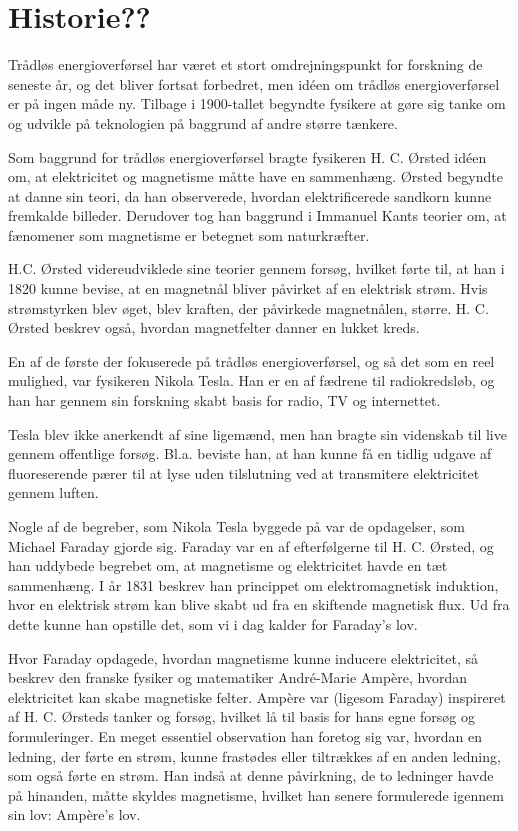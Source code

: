 \section{Historie??}

Trådløs energioverførsel har været et stort omdrejningspunkt for forskning de seneste år, og det bliver fortsat forbedret, men idéen om trådløs energioverførsel er på ingen måde ny. Tilbage i 1900-tallet begyndte fysikere at gøre sig tanke om og udvikle på teknologien på baggrund af andre større tænkere.

Som baggrund for trådløs energioverførsel bragte fysikeren H. C. Ørsted idéen om, at elektricitet og magnetisme måtte have en sammenhæng. Ørsted begyndte at danne sin teori, da han observerede, hvordan elektrificerede sandkorn kunne fremkalde billeder. Derudover tog han baggrund i Immanuel Kants teorier om, at fænomener som magnetisme er betegnet som naturkræfter.

H.C. Ørsted videreudviklede sine teorier gennem forsøg, hvilket førte til, at han i 1820 kunne bevise, at en magnetnål bliver påvirket af en elektrisk strøm. Hvis strømstyrken blev øget, blev kraften, der påvirkede magnetnålen, større. H. C. Ørsted beskrev også, hvordan magnetfelter danner en lukket kreds.

En af de første der fokuserede på trådløs energioverførsel, og så det som en reel mulighed, var fysikeren Nikola Tesla. Han er en af fædrene til radiokredsløb, og han har gennem sin forskning skabt basis for radio, TV og internettet.

Tesla blev ikke anerkendt af sine ligemænd, men han bragte sin videnskab til live gennem offentlige forsøg. Bl.a. beviste han, at han kunne få en tidlig udgave af fluoreserende pærer til at lyse uden tilslutning ved at transmitere elektricitet gennem luften.

Nogle af de begreber, som Nikola Tesla byggede på var de opdagelser, som Michael Faraday gjorde sig. Faraday var en af efterfølgerne til H. C. Ørsted, og han uddybede begrebet om, at magnetisme og elektricitet havde en tæt sammenhæng. I år 1831 beskrev han princippet om elektromagnetisk induktion, hvor en elektrisk strøm kan blive skabt ud fra en skiftende magnetisk flux. Ud fra dette kunne han opstille det, som vi i dag kalder for Faraday's lov.

Hvor Faraday opdagede, hvordan magnetisme kunne inducere elektricitet, så beskrev den franske fysiker og matematiker André-Marie Ampère, hvordan elektricitet kan skabe magnetiske felter. Ampère var (ligesom Faraday) inspireret af H. C. Ørsteds tanker og forsøg, hvilket lå til basis for hans egne forsøg og formuleringer. En meget essentiel observation han foretog sig var, hvordan en ledning, der førte en strøm, kunne frastødes eller tiltrækkes af en anden ledning, som også førte en strøm. Han indså at denne påvirkning, de to ledninger havde på hinanden, måtte skyldes magnetisme, hvilket han senere formulerede igennem sin lov: Ampère's lov.

